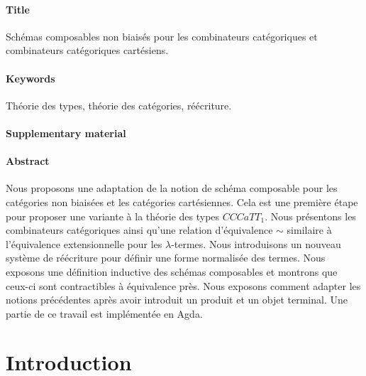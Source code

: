 \documentclass[12pt']{article}
\begin{document}
\paragraph{Title} Schémas composables non biaisés pour les combinateurs catégoriques et combinateurs catégoriques cartésiens.

\paragraph{Keywords} Théorie des types, théorie des catégories, réécriture.

\paragraph{Supplementary material} 

\paragraph{Abstract} Nous proposons une adaptation de la notion de schéma composable pour les catégories non biaisées et les catégories cartésiennes. Cela est une première étape pour proposer une variante à la théorie des types $CCCaTT_1$. Nous présentons les combinateurs catégoriques ainsi qu'une relation d'équivalence $\sim$ similaire à l'équivalence extensionnelle pour les $\lambda$-termes. Nous introduisons un nouveau système de réécriture pour définir une forme normalisée des termes. Nous exposons une définition inductive des schémas composables et montrons que ceux-ci sont contractibles à équivalence près. Nous exposons comment adapter les notions précédentes après avoir introduit un produit et un objet terminal. Une partie de ce travail est implémentée en Agda.



\section{Introduction}
	
\end{document}

